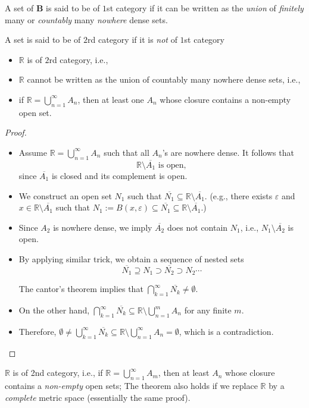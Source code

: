 \begin{definition}[$1$st category]
A set of $\bm B$ is said to be of $1$st category if it can be written as the \emph{union} of \emph{finitely} many or \emph{countably} many \emph{nowhere} dense sets.
\end{definition}
\begin{definition}[$2$rd category]
A set is said to be of $2$rd category if it is \emph{not} of $1$st category
\end{definition}
\begin{theorem}
\begin{itemize}
\item
$\mathbb{R}$ is of $2$rd category, i.e.,
\item
$\mathbb{R}$ cannot be written as the union of countably many nowhere dense sets, i.e.,
\item
if $\mathbb{R}=\bigcup_{n=1}^\infty A_n$, then at least one $A_n$ whose closure contains a non-empty open set.
\end{itemize}
\end{theorem}

\begin{proof}
\begin{itemize}
\item
Assume $\mathbb{R} = \bigcup_{n=1}^\infty A_n$ such that all $A_n$'s are nowhere dense. It follows that
\[
\mathbb{R}\setminus \overline{A_1}\mbox{ is open},
\]
since $\overline{A_1}$ is closed and its complement is open.
\item
We construct an open set $N_1$ such that $\overline{N_1}\subseteq\mathbb{R}\setminus \overline{A_1}$. (e.g., there exists $\varepsilon$ and $x\in\mathbb{R}\setminus \overline{A_1}$ such that $N_1:=B(x,\varepsilon)\subseteq\overline{N_1}\subseteq\mathbb{R}\setminus \overline{A_1}$.)
\item
Since $A_2$ is nowhere dense, we imply $\overline{A_2}$ does not contain $N_1$, i.e., $N_1\setminus \overline{A_2}$ is open.
\item
By applying similar trick,  we obtain a sequence of nested  sets
\[
\overline{N_1}\supseteq N_1\supset\overline{N_2}\supset N_2\cdots
\]

The cantor's theorem implies that $\bigcap_{k=1}^\infty\overline{N_k}\ne\emptyset$.
\item
On the other hand, $\bigcap_{k=1}^\infty\overline{N_k}\subseteq\mathbb{R}\setminus \bigcup_{n=1}^mA_n$ for any finite $m$.
\item
Therefore, $\emptyset\ne\bigcup_{k=1}^\infty\overline{N_k}\subseteq\mathbb{R}\setminus \bigcup_{n=1}^\infty A_n=\emptyset$, which is a contradiction.
\end{itemize}
\end{proof}
\begin{remark}
$\mathbb{R}$ is of 2nd category, i.e., if $\mathbb{R} = \bigcup_{n=1}^\infty A_m$, then at least $A_n$ whose closure contains a \emph{non-empty} open sets; The theorem also holds if we replace $\mathbb{R}$ by a \emph{complete} metric space (essentially the same proof).
\end{remark}

